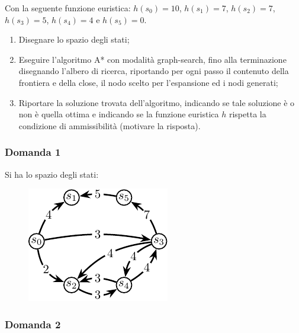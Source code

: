 \documentclass{article}
\numberwithin{equation}{section}
\begin{document}
Con la seguente funzione euristica: $h(s_0)=10$, $h(s_1)=7$, $h(s_2)=7$, $h(s_3)=5$, $h(s_4)=4$ e $h(s_5)=0$. 

\begin{enumerate}
    \item Disegnare lo spazio degli stati;
    \item Eseguire l'algoritmo A* con modalità graph-search, fino alla terminazione disegnando l'albero di ricerca, riportando per ogni passo il 
contenuto della frontiera e della close, il nodo scelto per l'espansione ed i nodi generati;
    \item Riportare la soluzione trovata dell'algoritmo, indicando se tale soluzione è o non è quella ottima e indicando se la funzione euristica 
$h$ rispetta la condizione di ammissibilità (motivare la risposta). 
\end{enumerate}

\subsubsection*{Domanda 1}

Si ha lo spazio degli stati:
\begin{figure}[H]%
    \centering%
    \includegraphics{spazio_stati_25-11-24.pdf}%
\end{figure}

\subsubsection*{Domanda 2}
\end{document}
